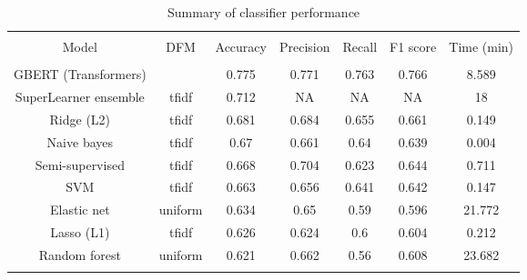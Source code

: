 
\begin{table}[!htbp] \centering 
  \caption{Summary of classifier performance} 
  \label{tab:tm-eval} 
\begin{tabular}{@{\extracolsep{5pt}} ccccccc} 
\\[-1.8ex]\hline 
\hline \\[-1.8ex] 
Model & DFM & Accuracy & Precision & Recall & F1 score & Time (min) \\ 
\hline \\[-1.8ex] 
GBERT (Transformers) &  & 0.775 & 0.771 & 0.763 & 0.766 & 8.589 \\ 
SuperLearner ensemble & tfidf & 0.712 & NA & NA & NA & 18 \\ 
Ridge (L2) & tfidf & 0.681 & 0.684 & 0.655 & 0.661 & 0.149 \\ 
Naive bayes & tfidf & 0.67 & 0.661 & 0.64 & 0.639 & 0.004 \\ 
Semi-supervised & tfidf & 0.668 & 0.704 & 0.623 & 0.644 & 0.711 \\ 
SVM & tfidf & 0.663 & 0.656 & 0.641 & 0.642 & 0.147 \\ 
Elastic net & uniform & 0.634 & 0.65 & 0.59 & 0.596 & 21.772 \\ 
Lasso (L1) & tfidf & 0.626 & 0.624 & 0.6 & 0.604 & 0.212 \\ 
Random forest & uniform & 0.621 & 0.662 & 0.56 & 0.608 & 23.682 \\ 
\hline \\[-1.8ex] 
\end{tabular} 
\end{table} 
